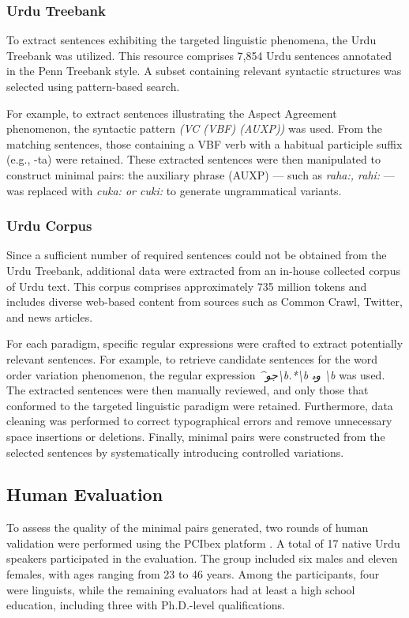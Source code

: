 \documentclass[11pt]{article}
\begin{document}
\subsubsection{Urdu Treebank}
To extract sentences exhibiting the targeted linguistic phenomena, the Urdu Treebank \cite{cletreebank} was utilized. This resource comprises 7,854 Urdu sentences annotated in the Penn Treebank style. A subset containing relevant syntactic structures was selected using pattern-based search. 

For example, to extract sentences illustrating the Aspect Agreement phenomenon, the syntactic pattern \textit{(VC (VBF) (AUXP))} was used. From the matching sentences, those containing a VBF verb with a habitual participle suffix (e.g., -ta) were retained. These extracted sentences were then manipulated to construct minimal pairs: the auxiliary phrase (AUXP) — such as \textit{raha:, rahi:} — was replaced with \textit{cuka: or cuki:} to generate ungrammatical variants. 
\subsubsection{Urdu Corpus}
Since a sufficient number of required sentences could not be obtained from the Urdu Treebank, additional data were extracted from an in-house collected corpus of Urdu text. This corpus comprises approximately 735 million tokens and includes diverse web-based content from sources such as Common Crawl, Twitter, and news articles.

For each paradigm, specific regular expressions were crafted to extract potentially relevant sentences. For example, to retrieve candidate sentences for the word order variation phenomenon, the regular expression 
\textit{\^{}\foreignlanguage{arabic}{جو}\textbackslash b.*\textbackslash b \foreignlanguage{arabic}{ وہ }\textbackslash b}
was used. The extracted sentences were then manually reviewed, and only those that conformed to the targeted linguistic paradigm were retained. Furthermore, data cleaning was performed to correct typographical errors and remove unnecessary space insertions or deletions. Finally, minimal pairs were constructed from the selected sentences by systematically introducing controlled variations.

\subsection{Human Evaluation}
To assess the quality of the minimal pairs generated, two rounds of human validation were performed using the PCIbex platform \cite{pcibex}. A total of 17 native Urdu speakers participated in the evaluation. The group included six males and eleven females, with ages ranging from 23 to 46 years. Among the participants, four were linguists, while the remaining evaluators had at least a high school education, including three with Ph.D.-level qualifications.
\end{document}
